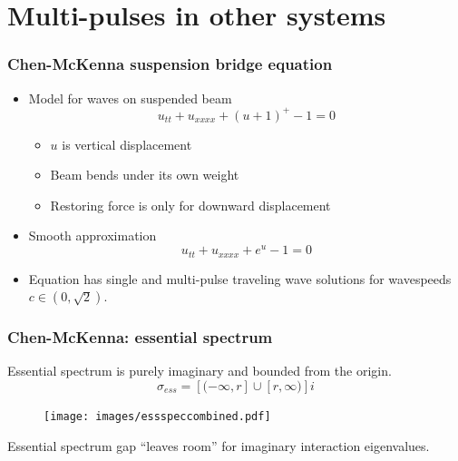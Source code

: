 \documentclass[16pt]{beamer}
\begin{document}
\section{Multi-pulses in other systems}

\begin{frame}
	\frametitle{Chen-McKenna suspension bridge equation}
	\fontsize{16}{7.2}\selectfont
	\begin{itemize}
	\item Model for waves on suspended beam 
     \[ u_{tt} + u_{xxxx} + (u+1)^+ - 1 = 0 \]
     \begin{itemize}
     	\item $u$ is vertical displacement
     	\item Beam bends under its own weight
     	\item Restoring force is only for downward displacement
     \end{itemize}
     \item Smooth approximation
 	\[ u_{tt} + u_{xxxx} + e^{u} - 1 = 0 \]
 	 \item Equation has single and multi-pulse traveling wave solutions for wavespeeds $c \in (0, \sqrt{2})$.
 \end{itemize}
\end{frame}

\begin{frame}
\frametitle{Chen-McKenna: essential spectrum}
	\fontsize{16}{7.2}\selectfont
	Essential spectrum is purely imaginary and bounded from the origin.
	\[ \sigma_{ess} = [ (-\infty, r] \cup [r, \infty) ]i \]
	\begin{figure}
	\begin{center}
	\texttt{[image: images/essspeccombined.pdf]}
	\end{center}
	\end{figure}
	Essential spectrum gap ``leaves room'' for imaginary interaction eigenvalues.
\end{frame}
\end{document}
